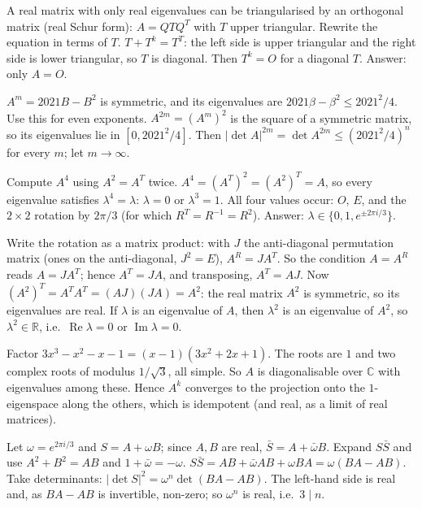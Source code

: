 \documentclass[11pt,a4paper]{article}
\begin{document}

A real matrix with only real eigenvalues can be triangularised by an orthogonal matrix (real Schur form): \(A=QTQ^T\) with \(T\) upper triangular. Rewrite the equation in terms of \(T\).
\(T+T^k=T^T\): the left side is upper triangular and the right side is lower triangular, so \(T\) is diagonal. Then \(T^k=O\) for a diagonal \(T\). Answer: only \(A=O\).

\(A^m=2021B-B^2\) is symmetric, and its eigenvalues are \(2021\beta-\beta^2\le 2021^2/4\). Use this for even exponents.
\(A^{2m}=(A^m)^2\) is the square of a symmetric matrix, so its eigenvalues lie in \([0,2021^2/4]\). Then \(\lvert\det A\rvert^{2m}=\det A^{2m}\le(2021^2/4)^n\) for every \(m\); let \(m\to\infty\).

Compute \(A^4\) using \(A^2=A^T\) twice.
\(A^4=(A^T)^2=(A^2)^T=A\), so every eigenvalue satisfies \(\lambda^4=\lambda\): \(\lambda=0\) or \(\lambda^3=1\). All four values occur: \(O\), \(E\), and the \(2\times2\) rotation by \(2\pi/3\) (for which \(R^T=R^{-1}=R^2\)). Answer: \(\lambda\in\{0,1,e^{\pm2\pi i/3}\}\).

Write the rotation as a matrix product: with \(J\) the anti-diagonal permutation matrix (ones on the anti-diagonal, \(J^2=E\)), \(A^R=JA^T\). So the condition \(A=A^R\) reads \(A=JA^T\); hence \(A^T=JA\), and transposing, \(A^T=AJ\).
Now \((A^2)^T=A^TA^T=(AJ)(JA)=A^2\): the real matrix \(A^2\) is symmetric, so its eigenvalues are real. If \(\lambda\) is an eigenvalue of \(A\), then \(\lambda^2\) is an eigenvalue of \(A^2\), so \(\lambda^2\in\mathbb R\), i.e.\ \(\operatorname{Re}\lambda=0\) or \(\operatorname{Im}\lambda=0\).

Factor \(3x^3-x^2-x-1=(x-1)(3x^2+2x+1)\).
The roots are \(1\) and two complex roots of modulus \(1/\sqrt3\), all simple. So \(A\) is diagonalisable over \(\mathbb C\) with eigenvalues among these. Hence \(A^k\) converges to the projection onto the \(1\)-eigenspace along the others, which is idempotent (and real, as a limit of real matrices).

Let \(\omega=e^{2\pi i/3}\) and \(S=A+\omega B\); since \(A,B\) are real, \(\bar S=A+\bar\omega B\). Expand \(S\bar S\) and use \(A^2+B^2=AB\) and \(1+\bar\omega=-\omega\).
\(S\bar S=AB+\bar\omega AB+\omega BA=\omega(BA-AB)\). Take determinants: \(|\det S|^2=\omega^n\det(BA-AB)\). The left-hand side is real and, as \(BA-AB\) is invertible, non-zero; so \(\omega^n\) is real, i.e.\ \(3\mid n\).
\end{document}
